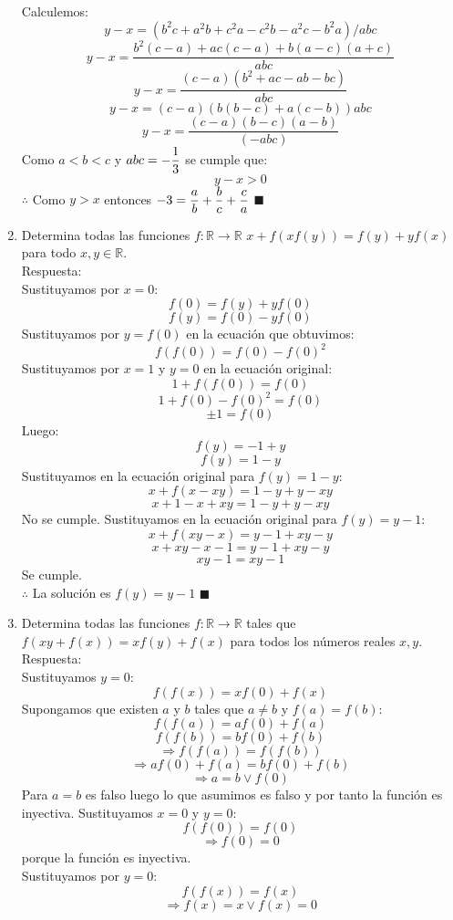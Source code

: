 \documentclass{book}
\newcommand{\R}{\mathbb{R}} \newcommand{\N}{\mathbb{N}}
\begin{document}
\begin{enumerate}
        Calculemos:
        $$y-x=(b^2 c+a^2 b+c^2 a-c^2 b-a^2 c-b^2 a)/abc$$
        $$y-x=\frac{b^2 (c-a)+ac(c-a)+b(a-c)(a+c)}{abc}$$
        $$y-x=\frac{(c-a)(b^2+ac-ab-bc)}{abc}$$
        $$y-x={(c-a)(b(b-c)+a(c-b))}{abc}$$
        $$y-x=\frac{(c-a)(b-c)(a-b)}{(-abc)}$$
        Como $a<b<c$ y  $\displaystyle{abc=-{1\over 3}}$ se cumple que:
        $$y-x>0$$
        $\therefore$ Como $y>x$ entonces $\displaystyle{-3={a\over b}+{b\over c}+{c\over a}}$ $\blacksquare$\\
        \item Determina todas las funciones $f:\R\rightarrow\R$ $x + f(xf(y))=f(y) + yf(x)$ para todo $x,y\in\R$.\\
        Respuesta:\\
        Sustituyamos por $x=0$:
        $$f(0) = f(y)+ yf(0)$$
        $$f(y)=f(0)- yf(0)$$
        Sustituyamos por $y=f(0)$ en la ecuación que obtuvimos:
        $$f(f(0))=f(0)-{f(0)}^2$$
        Sustituyamos por $x=1$ y $y=0$ en la ecuación original:
        $$1+ f(f(0)) = f(0)$$
        $$1+ f(0)-{f(0)}^2= f(0)$$
        $$\pm 1= f(0)$$
        Luego:
        $$f(y)=-1+ y$$
        $$f(y)=1- y$$
        Sustituyamos en la ecuación original para $f(y)=1- y$:
        $$x+ f(x-xy)= 1-y+y-xy$$
        $$x+1-x+xy= 1-y+y-xy$$
        No se cumple.
        Sustituyamos en la ecuación original para $f(y)=y- 1$:
        $$x+ f(xy-x)= y-1+xy-y$$
        $$x+xy-x-1= y-1+xy-y$$
        $$xy-1=xy-1$$
        Se cumple.\\
        $\therefore$ La solución es $f(y)=y-1 $ $\blacksquare$\\
        \item Determina todas las funciones $f:\R\rightarrow\R$ tales que $f(xy + f(x)) = xf(y) + f(x)$ para todos los números reales $x,y$.\\
        Respuesta:\\
        Sustituyamos $y=0$:
        $$f( f(x)) = xf(0)+ f(x)$$
        Supongamos que existen $a$ y $b$ tales que $a\neq b$ y $f(a)=f(b)$:
        $$f( f(a)) = af(0)+ f(a)$$
        $$f( f(b)) = bf(0)+ f(b)$$
        $$\Rightarrow f( f(a))=f( f(b))$$
        $$\Rightarrow af(0)+ f(a)=bf(0)+ f(b)$$
        $$\Rightarrow a=b \vee f(0)$$
        Para $a=b$ es falso luego lo que asumimos es falso y por tanto la función es inyectiva.
        Sustituyamos $x=0$ y $y=0$:
        $$f( f(0)) = f(0)$$
        $$\Rightarrow f(0)=0$$
        porque la función es inyectiva.\\
        Sustituyamos por $y=0$:
        $$f( f(x))= f(x)$$
        $$\Rightarrow f(x)=x \vee f(x)=0$$

\end{enumerate}
\end{document}
